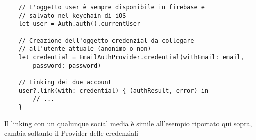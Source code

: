 \begin{verbatim}
    // L'oggetto user è sempre disponibile in firebase e
    // salvato nel keychain di iOS
    let user = Auth.auth().currentUser

    // Creazione dell'oggetto credenzial da collegare
    // all'utente attuale (anonimo o non)
    let credential = EmailAuthProvider.credential(withEmail: email,
        password: password)

    // Linking dei due account
    user?.link(with: credential) { (authResult, error) in
        // ...
    }
\end{verbatim}

Il linking con un qualunque social media è simile all'esempio riportato
qui sopra, cambia soltanto il Provider delle credenziali
